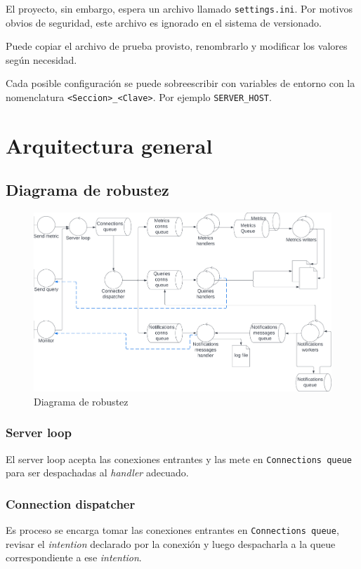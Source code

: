 \documentclass[a4paper,oneside]{article}
\begin{document}
El proyecto, sin embargo, espera un archivo llamado \texttt{settings.ini}. Por motivos obvios de seguridad, este archivo es ignorado en el sistema de versionado.

Puede copiar el archivo de prueba provisto, renombrarlo y modificar los valores según necesidad.

Cada posible configuración se puede sobreescribir con variables de entorno con la nomenclatura \texttt{<Seccion>\_<Clave>}. Por ejemplo \texttt{SERVER\_HOST}.

\section{Arquitectura general}
\subsection{Diagrama de robustez} \label{robustez}
\begin{figure}[H]
\centering
\includegraphics[width=\textwidth]{images/diagrama_robustez.png}
\caption{Diagrama de robustez}
\end{figure}

\subsubsection{Server loop}
El server loop acepta las conexiones entrantes y las mete en \texttt{Connections queue} para ser despachadas al \textit{handler} adecuado.

\subsubsection{Connection dispatcher}
Es proceso se encarga tomar las conexiones entrantes en \texttt{Connections queue}, revisar el \textit{intention} declarado por la conexión y luego despacharla a la queue correspondiente a ese \textit{intention}.
\end{document}
